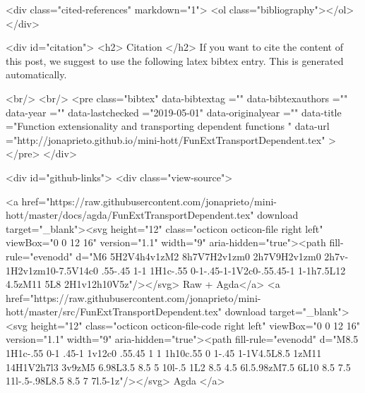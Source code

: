   <div class="cited-references" markdown="1">
  <ol class="bibliography"></ol>
  </div>


  
  <div id="citation">
  <h2> Citation </h2>
  If you want to cite the content of this post,
  we suggest to use the following latex bibtex entry.
  This is generated automatically.

  <br/>
  <br/>
  <pre class="bibtex"
       data-bibtextag =""
       data-bibtexauthors =""
       data-year =""
       data-lastchecked ="2019-05-01"
       data-originalyear =""
       data-title ="Function extensionality and transporting dependent functions "
       data-url ="http://jonaprieto.github.io/mini-hott/FunExtTransportDependent.tex"
  ></pre>
  </div>
  

  <div id="github-links">
    <div class="view-source">
      
        <a href="https://raw.githubusercontent.com/jonaprieto/mini-hott/master/docs/agda/FunExtTransportDependent.tex" download target="_blank"><svg height="12" class="octicon octicon-file right left" viewBox="0 0 12 16" version="1.1" width="9" aria-hidden="true"><path fill-rule="evenodd" d="M6 5H2V4h4v1zM2 8h7V7H2v1zm0 2h7V9H2v1zm0 2h7v-1H2v1zm10-7.5V14c0 .55-.45 1-1 1H1c-.55 0-1-.45-1-1V2c0-.55.45-1 1-1h7.5L12 4.5zM11 5L8 2H1v12h10V5z"/></svg> Raw + Agda</a>
        <a href="https://raw.githubusercontent.com/jonaprieto/mini-hott/master/src/FunExtTransportDependent.tex" download target="_blank"><svg height="12" class="octicon octicon-file-code right left" viewBox="0 0 12 16" version="1.1" width="9" aria-hidden="true"><path fill-rule="evenodd" d="M8.5 1H1c-.55 0-1 .45-1 1v12c0 .55.45 1 1 1h10c.55 0 1-.45 1-1V4.5L8.5 1zM11 14H1V2h7l3 3v9zM5 6.98L3.5 8.5 5 10l-.5 1L2 8.5 4.5 6l.5.98zM7.5 6L10 8.5 7.5 11l-.5-.98L8.5 8.5 7 7l.5-1z"/></svg> Agda </a>
      
